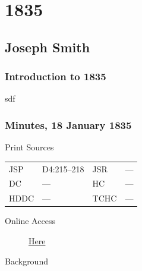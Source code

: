 \section{1835}
	\label{EMS-1835}
	
	\subsection{Joseph Smith}
		\label{EMS-1835-JS}

		\subsubsection{Introduction to 1835}
		
			sdf
	
		\subsubsection{Minutes, 18 January 1835}
			\label{EMS-1835-JS-18-JAN-1835}
			
			\begin{description}
					\item[Print Sources]
				\end{description}

					\begin{tabular}{p{0.5in}p{1in}p{0.5in}p{1in}}
					JSP	 	& D4:215--218		& JSR 		& --- \\
					DC	 	& --- 				& HC 		& --- \\
					HDDC 	& ---				& TCHC 		& --- \\
					\end{tabular}
				
				\begin{description}
					\item[Online Access] \href{https://www.josephsmithpapers.org/paper-summary/minutes-18-january-1835/1}{Here}
				\end{description}
				
				\begin{description}
					\item[Background]
				\end{description}
				
